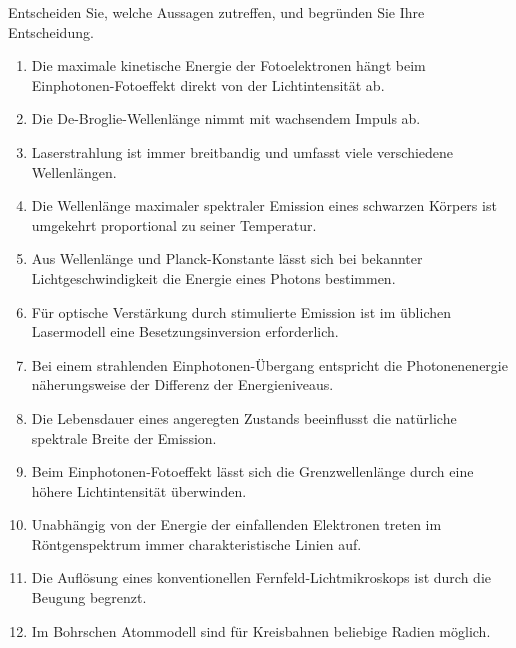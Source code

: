 \begin{ExerciseBlock}
Entscheiden Sie, welche Aussagen zutreffen, und begründen Sie Ihre Entscheidung.
\begin{enumerate}
\item Die maximale kinetische Energie der Fotoelektronen hängt beim Einphotonen-Fotoeffekt direkt von der Lichtintensität ab.
\item Die De-Broglie-Wellenlänge nimmt mit wachsendem Impuls ab.
\item Laserstrahlung ist immer breitbandig und umfasst viele verschiedene Wellenlängen.
\item Die Wellenlänge maximaler spektraler Emission eines schwarzen Körpers ist umgekehrt proportional zu seiner Temperatur.
\item Aus Wellenlänge und Planck-Konstante lässt sich bei bekannter Lichtgeschwindigkeit die Energie eines Photons bestimmen.
\item Für optische Verstärkung durch stimulierte Emission ist im üblichen Lasermodell eine Besetzungsinversion erforderlich.
\item Bei einem strahlenden Einphotonen-Übergang entspricht die Photonenenergie näherungsweise der Differenz der Energieniveaus.
\item Die Lebensdauer eines angeregten Zustands beeinflusst die natürliche spektrale Breite der Emission.
\item Beim Einphotonen-Fotoeffekt lässt sich die Grenzwellenlänge durch eine höhere Lichtintensität überwinden.
\item Unabhängig von der Energie der einfallenden Elektronen treten im Röntgenspektrum immer charakteristische Linien auf.
\item Die Auflösung eines konventionellen Fernfeld-Lichtmikroskops ist durch die Beugung begrenzt.
\item Im Bohrschen Atommodell sind für Kreisbahnen beliebige Radien möglich.
\end{enumerate}
\end{ExerciseBlock}
